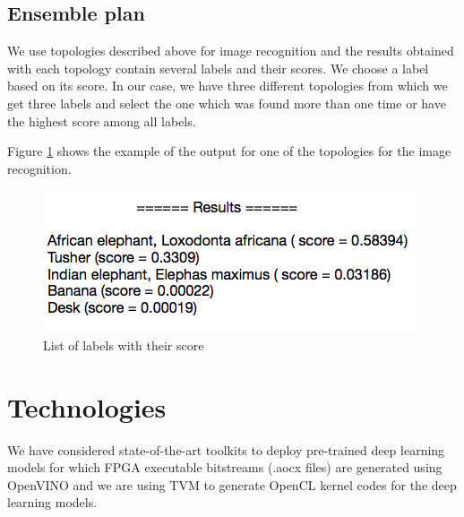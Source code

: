 \documentclass[titlepage]{report}
\begin{document}
\section{Ensemble plan}

We use topologies described above for image recognition and the results obtained with each topology contain several labels and their scores. We choose a label based on its score. In our case, we have three different topologies from which we get three labels and select the one which was found more than one time or have the highest score among all labels. 

Figure \ref{fig:topology_results} shows the example of the output for one of the topologies for the image recognition.



\begin{figure}[h!]
    \centering
    \includegraphics[scale=0.8]{topology_results.png}
    \caption{List of labels with their score}
    \label{fig:topology_results}
\end{figure}


\pagebreak


\chapter{Technologies}
We have considered state-of-the-art toolkits to deploy pre-trained deep learning models for which FPGA executable bitstreams (.aocx files) are generated using OpenVINO and we are using TVM to generate OpenCL kernel codes for the deep learning models.
\end{document}
